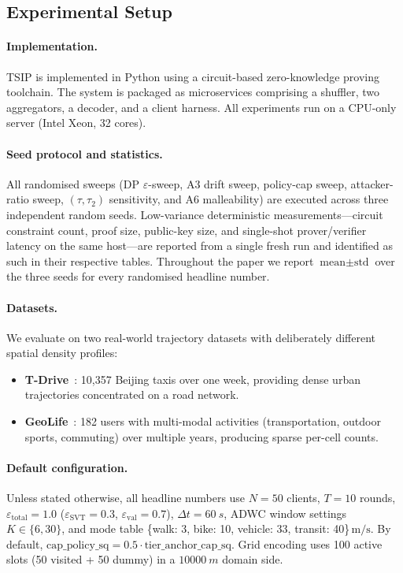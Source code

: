 \documentclass[conference]{IEEEtran}
\theoremstyle{definition}
\theoremstyle{plain}
\begin{document}
\subsection{Experimental Setup}
\label{sec:setup}

\paragraph{Implementation.}
\textsc{TSIP} is implemented in Python using a circuit-based zero-knowledge
proving toolchain. The system is packaged as microservices comprising a
shuffler, two aggregators, a decoder, and a client harness.
All experiments run on a CPU-only server (Intel Xeon, 32 cores).

\paragraph{Seed protocol and statistics.}
All randomised sweeps (DP $\varepsilon$-sweep, A3 drift sweep,
policy-cap sweep, attacker-ratio sweep, $(\tau,\tau_2)$ sensitivity,
and A6 malleability) are executed across three independent random seeds.
Low-variance deterministic measurements---circuit constraint count,
proof size, public-key size, and single-shot prover/verifier latency
on the same host---are reported from a single fresh run and identified
as such in their respective tables.
Throughout the paper we report $\text{mean}\pm\text{std}$ over the three
seeds for every randomised headline number.

\paragraph{Datasets.}
We evaluate on two real-world trajectory datasets with deliberately
different spatial density profiles:
\begin{itemize}
    \item \textbf{T-Drive}~\cite{Yuan2010Tdrive}: 10{,}357 Beijing taxis over one week, providing dense urban trajectories concentrated on a road network.
    \item \textbf{GeoLife}~\cite{Zheng2010GeoLife}: 182 users with multi-modal activities (transportation, outdoor sports, commuting) over multiple years, producing sparse per-cell counts.
\end{itemize}

\paragraph{Default configuration.}
Unless stated otherwise, all headline numbers use
$N{=}50$ clients, $T{=}10$ rounds, $\varepsilon_{\mathrm{total}}{=}1.0$
($\varepsilon_{\mathrm{SVT}}{=}0.3$, $\varepsilon_{\mathrm{val}}{=}0.7$),
$\Delta t{=}\SI{60}{s}$, ADWC window settings $K\in\{6,30\}$, and mode table
\{walk: 3, bike: 10, vehicle: 33, transit: 40\}\,$\mathrm{m/s}$.
By default, $\mathrm{cap\_policy\_sq}=0.5\cdot\mathrm{tier\_anchor\_cap\_sq}$.
Grid encoding uses 100 active slots (50 visited + 50 dummy) in a
$\SI{10000}{m}$ domain side.
\end{document}
